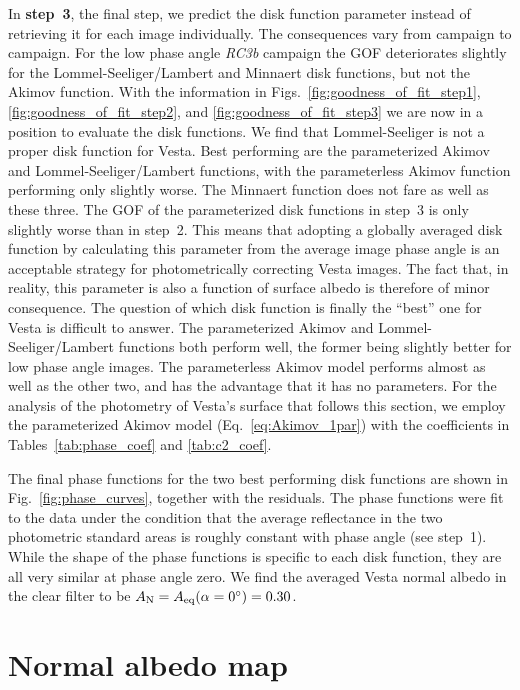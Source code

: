 \documentclass[3p,authoryear]{elsarticle}
\begin{document}
In {\bf step~3}, the final step, we predict the disk function parameter instead of retrieving it for each image individually. The consequences vary from campaign to campaign. For the low phase angle {\it RC3b} campaign the GOF deteriorates slightly for the Lommel-Seeliger/Lambert and Minnaert disk functions, but not the Akimov function. With the information in Figs.~\ref{fig:goodness_of_fit_step1}, \ref{fig:goodness_of_fit_step2}, and \ref{fig:goodness_of_fit_step3} we are now in a position to evaluate the disk functions. We find that Lommel-Seeliger is not a proper disk function for Vesta. Best performing are the parameterized Akimov and Lommel-Seeliger/Lambert functions, with the parameterless Akimov function performing only slightly worse. The Minnaert function does not fare as well as these three. The GOF of the parameterized disk functions in step~3 is only slightly worse than in step~2. This means that adopting a globally averaged disk function by calculating this parameter from the average image phase angle is an acceptable strategy for photometrically correcting Vesta images. The fact that, in reality, this parameter is also a function of surface albedo is therefore of minor consequence. The question of which disk function is finally the ``best'' one for Vesta is difficult to answer. The parameterized Akimov and Lommel-Seeliger/Lambert functions both perform well, the former being slightly better for low phase angle images. The parameterless Akimov model performs almost as well as the other two, and has the advantage that it has no parameters. For the analysis of the photometry of Vesta's surface that follows this section, we employ the parameterized Akimov model (Eq.~\ref{eq:Akimov_1par}) with the coefficients in Tables~\ref{tab:phase_coef} and \ref{tab:c2_coef}.

The final phase functions for the two best performing disk functions are shown in Fig.~\ref{fig:phase_curves}, together with the residuals. The phase functions were fit to the data under the condition that the average reflectance in the two photometric standard areas is roughly constant with phase angle (see step~1). While the shape of the phase functions is specific to each disk function, they are all very similar at phase angle zero. We find the averaged Vesta normal albedo in the clear filter to be $A_{\rm N} = A_{\rm eq}(\alpha = 0^\circ) = 0.30$.


\section{Normal albedo map}
\label{sec:albedo_map}
\end{document}
